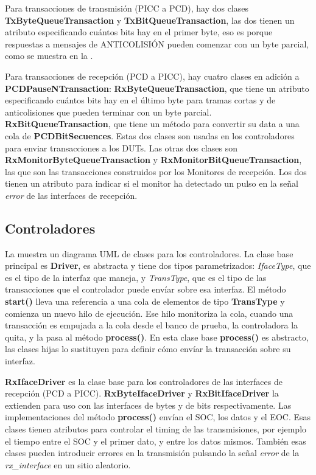 \documentclass[a4paper, twoside, 11pt]{report}
\begin{document}
Para transacciones de transmisión (PICC a PCD), hay dos clases \textbf{TxByteQueueTransaction} y \textbf{TxBitQueueTransaction}, las dos tienen un atributo especificando cuántos bits hay en el primer byte, eso es porque respuestas a mensajes de ANTICOLISIÓN pueden comenzar con un byte parcial, como se muestra en la .

Para transacciones de recepción (PCD a PICC), hay cuatro clases en adición a \textbf{PCDPauseNTransaction}: \textbf{RxByteQueueTransaction}, que tiene un atributo especificando cuántos bits hay en el último byte para tramas cortas y de anticolisiones que pueden terminar con un byte parcial. \textbf{RxBitQueueTransaction}, que tiene un método para convertir su data a una cola de \textbf{PCDBitSecuences}. Estas dos clases son usadas en los controladores para enviar transacciones a los DUTs. Las otras dos clases son \textbf{RxMonitorByteQueueTransaction} y \textbf{RxMonitorBitQueueTransaction}, las que son las transacciones construidos por los Monitores de recepción. Los dos tienen un atributo para indicar si el monitor ha detectado un pulso en la señal \textit{error} de las interfaces de recepción.

\FloatBarrier
\subsection{Controladores}

La  muestra un diagrama UML de clases para los controladores. La clase base principal es \textbf{Driver}, es abstracta y tiene dos tipos parametrizados: \textit{IfaceType}, que es el tipo de la interfaz que maneja, y \textit{TransType}, que es el tipo de las transacciones que el controlador puede envíar sobre esa interfaz. El método \textbf{start()} lleva una referencia a una cola de elementos de tipo \textbf{TransType} y comienza un nuevo hilo de ejecución. Ese hilo monitoriza la cola, cuando una transacción es empujada a la cola desde el banco de prueba, la controladora la quita, y la pasa al método \textbf{process()}. En esta clase base \textbf{process()} es abstracto, las clases hijas lo sustituyen para definir cómo envíar la transacción sobre su interfaz.

\textbf{RxIfaceDriver} es la clase base para los controladores de las interfaces de recepción (PCD a PICC). \textbf{RxByteIfaceDriver} y \textbf{RxBitIfaceDriver} la extienden para uso con las interfaces de bytes y de bits respectivamente. Las implementaciones del método \textbf{process()} envían el SOC, los datos y el EOC. Esas clases tienen atributos para controlar el timing de las transmisiones, por ejemplo el tiempo entre el SOC y el primer dato, y entre los datos mismos. También esas clases pueden introducir errores en la transmisión pulsando la señal \textit{error} de la \textit{rx\_interface} en un sitio aleatorio.
\end{document}
